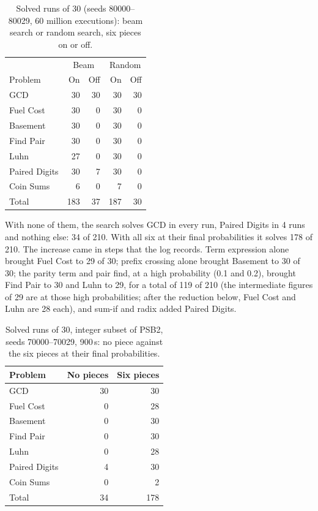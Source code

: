 \documentclass[sigconf,nonacm]{acmart}
\begin{document}
\begin{table}[t]
  \caption{Solved runs of 30 (seeds 80000--80029, 60 million executions): beam search or random search, six pieces on or off.}
  \label{tab:arms}
  \begin{tabular}{lrrrr}
    \toprule
    & \multicolumn{2}{c}{Beam} & \multicolumn{2}{c}{Random} \\
    Problem & On & Off & On & Off \\
    \midrule
    GCD & 30 & 30 & 30 & 30 \\
    Fuel Cost & 30 & 0 & 30 & 0 \\
    Basement & 30 & 0 & 30 & 0 \\
    Find Pair & 30 & 0 & 30 & 0 \\
    Luhn & 27 & 0 & 30 & 0 \\
    Paired Digits & 30 & 7 & 30 & 0 \\
    Coin Sums & 6 & 0 & 7 & 0 \\
    \midrule
    Total & 183 & 37 & 187 & 30 \\
    \bottomrule
  \end{tabular}
\end{table}
With none of them, the search solves GCD in every run, Paired Digits in 4 runs and nothing else: 34 of 210. With all six at their final
probabilities it solves 178 of 210. The increase came in steps that the log records. Term expression alone brought Fuel Cost to 29 of 30; prefix crossing alone
brought Basement to 30 of 30; the parity term and pair find, at a high probability (0.1 and 0.2), brought Find Pair to 30 and Luhn to 29, for a
total of 119 of 210 (the intermediate figures of 29 are at those high probabilities; after the reduction below, Fuel Cost and Luhn are 28 each), and sum-if and radix added Paired Digits.

\begin{table}[t]
  \caption{Solved runs of 30, integer subset of PSB2, seeds 70000--70029, 900\,s: no piece against the six pieces at their final probabilities.}
  \label{tab:ablation}
  \begin{tabular}{lrr}
    \toprule
    Problem & No pieces & Six pieces \\
    \midrule
    GCD & 30 & 30 \\
    Fuel Cost & 0 & 28 \\
    Basement & 0 & 30 \\
    Find Pair & 0 & 30 \\
    Luhn & 0 & 28 \\
    Paired Digits & 4 & 30 \\
    Coin Sums & 0 & 2 \\
    \midrule
    Total & 34 & 178 \\
    \bottomrule
  \end{tabular}
\end{table}
\end{document}
